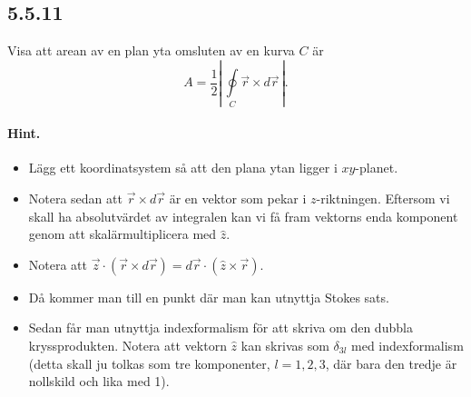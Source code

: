 \documentclass[%
oneside,                 %
final,                   %
10pt]{article}
\newenvironment{doconceexercise}{}{}
\newcounter{doconceexercisecounter}
\begin{document}
\begin{doconceexercise}

\subsection*{5.5.11}

Visa att arean av en plan yta omsluten av en kurva $C$ är
\begin{equation*}
A=\frac{1}{2} \left| \,\oint\limits_C\vec{r}\times d\vec{r}\, \right|.
\end{equation*}


\paragraph{Hint.}
\begin{itemize}
\item Lägg ett koordinatsystem så att den plana ytan ligger i $xy$-planet.

\item Notera sedan att $\vec{r}\times d\vec{r}$ är en vektor som pekar i $z$-riktningen. Eftersom vi skall ha absolutvärdet av integralen kan vi få fram vektorns enda komponent genom att skalärmultiplicera med $\hat{z}$.

\item Notera att $\vec{z} \cdot (\vec{r}\times d\vec{r}) = d\vec{r} \cdot (\hat{z} \times \vec{r})$.

\item Då kommer man till en punkt där man kan utnyttja Stokes sats. 

\item Sedan får man utnyttja indexformalism för att skriva om den dubbla kryssprodukten. Notera att vektorn $\hat{z}$ kan skrivas som $\delta_{3l}$ med indexformalism (detta skall ju tolkas som tre komponenter, $l=1,2,3$, där bara den tredje är nollskild och lika med 1).
\end{itemize}

\noindent

\end{doconceexercise}


\end{document}
